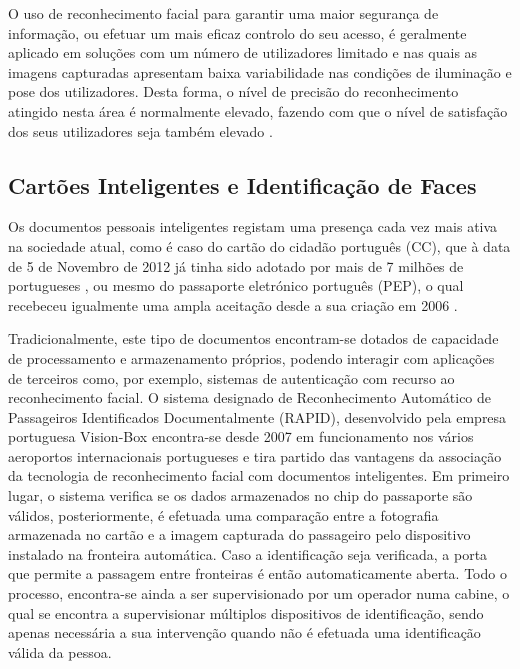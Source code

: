 O uso de reconhecimento facial para garantir uma maior segurança de informação, ou efetuar um mais eficaz controlo do seu acesso, é geralmente aplicado em soluções com um número de utilizadores limitado e nas quais as imagens capturadas apresentam baixa variabilidade nas condições de iluminação e pose dos utilizadores. Desta forma, o nível de precisão do reconhecimento atingido nesta área é normalmente elevado, fazendo com que o nível de satisfação dos seus utilizadores seja também elevado \cite{Li2011}.

\subsection{Cartões Inteligentes e Identificação de Faces} \label{CartoesInteligentes}
Os documentos pessoais inteligentes registam uma presença cada vez mais ativa na sociedade atual, como é caso do cartão do cidadão português (CC), que à data de 5 de Novembro de 2012 já tinha sido adotado por mais de 7 milhões de portugueses \citep{Administrativa}, ou mesmo do passaporte eletrónico português (PEP), o qual recebeceu igualmente uma ampla aceitação desde a sua criação em 2006 \citep{MinisteriodaAdministracaoInterna}.

Tradicionalmente, este tipo de documentos encontram-se dotados de capacidade de processamento e armazenamento próprios, podendo interagir com aplicações de terceiros como, por exemplo, sistemas de autenticação com recurso ao reconhecimento facial. O sistema designado de Reconhecimento Automático de Passageiros Identificados Documentalmente (RAPID)\citep{MinisteriodaAdministracaoInternaa}, desenvolvido pela empresa portuguesa Vision-Box \citep{Vision-Box} encontra-se desde 2007 em funcionamento nos vários aeroportos internacionais portugueses e tira partido das vantagens da associação da tecnologia de reconhecimento facial com documentos inteligentes. Em primeiro lugar, o sistema verifica se os dados armazenados no chip do passaporte são válidos, posteriormente, é efetuada uma comparação entre a fotografia armazenada no cartão e a imagem capturada do passageiro pelo dispositivo instalado na fronteira automática. Caso a identificação seja verificada, a porta que permite a passagem entre fronteiras é então automaticamente aberta. Todo o processo, encontra-se ainda a ser supervisionado por um operador numa cabine, o qual se encontra a supervisionar múltiplos dispositivos de identificação, sendo apenas necessária a sua intervenção quando não é efetuada uma identificação válida da pessoa.

